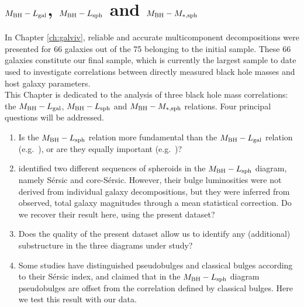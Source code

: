 \chapter{$M_{\rm BH} - L_{\rm gal}$, $M_{\rm BH} - L_{\rm sph}$ and $M_{\rm BH} - M_{\rm *,sph}$ }
\label{ch:mm} 

In Chapter \ref{ch:galviv}, reliable and accurate multicomponent decompositions were presented 
for 66 galaxies out of the 75 belonging to the initial sample. 
These 66 galaxies constitute our final sample, 
which is currently the largest sample to date used to investigate correlations between 
directly measured black hole masses and host galaxy parameters. \\

This Chapter is dedicated to the analysis of three black hole mass correlations: 
the $M_{\rm BH} - L_{\rm gal}$, $M_{\rm BH} - L_{\rm sph}$ and $M_{\rm BH} - M_{\rm *,sph}$ relations. 
Four principal questions will be addressed. 

\begin{enumerate}

\item Is the $M_{\rm BH} - L_{\rm sph}$ relation more fundamental than the $M_{\rm BH} - L_{\rm gal}$ relation 
      (e.g.~\citealt{kormendyho2013}), 
      or are they equally important (e.g.~\citealt{lasker2014anal})?

\item \cite{grahamscott2013} identified two different sequences of spheroids in the $M_{\rm BH} - L_{\rm sph}$ 
      diagram, namely S\'ersic and core-S\'ersic. 
      However, their bulge luminosities were not derived from individual galaxy decompositions, 
      but they were inferred from observed, total galaxy magnitudes 
      through a mean statistical correction. 
      Do we recover their result here, using the present dataset? 
           
\item Does the quality of the present dataset allow us to identify any (additional) substructure 
      in the three diagrams under study?
       
\item Some studies have distinguished pseudobulges and classical bulges according to their S\'ersic index, 
      and claimed that in the $M_{\rm BH} - L_{\rm sph}$ diagram 
      pseudobulges are offset from the correlation defined by classical bulges. 
      Here we test this result with our data. 

\end{enumerate}

